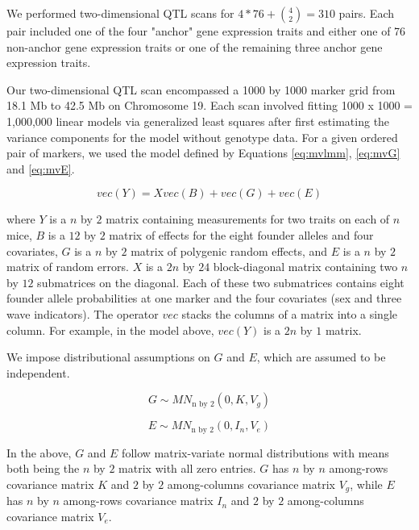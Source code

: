 \documentclass{article}
\begin{document}
We performed two-dimensional QTL scans for $4 * 76 + \binom{4}{2} = 310$ pairs. Each pair included one of the four "anchor" gene expression traits and either one of 76 non-anchor gene expression traits or one of the remaining three anchor gene expression traits. 

Our two-dimensional QTL scan encompassed a 1000 by 1000 marker grid from 18.1 Mb to 42.5 Mb on Chromosome 19. Each scan involved fitting 1000 x 1000 = 1,000,000 linear models via generalized least squares after first estimating the variance components for the model without genotype data. For a given ordered pair of markers, we used the model defined by Equations \ref{eq:mvlmm}, \ref{eq:mvG} and \ref{eq:mvE}.

\begin{equation}
vec(Y) = Xvec(B) + vec(G) + vec(E)
\label{eq:mvlmm}
\end{equation}

where $Y$ is a $n$ by $2$ matrix containing measurements for two traits on each of $n$ mice, $B$ is a $12$ by $2$ matrix of effects for the eight founder alleles and four covariates, $G$ is a $n$ by $2$ matrix of polygenic random effects, and $E$ is a $n$ by $2$ matrix of random errors. $X$ is a $2n$ by $24$ block-diagonal matrix containing two $n$ by $12$ submatrices on the diagonal. Each of these two submatrices contains eight founder allele probabilities at one marker and the four covariates (sex and three wave indicators). The operator $vec$ stacks the columns of a matrix into a single column. For example, in the model above, $vec(Y)$ is a $2n$ by $1$ matrix. 

We impose distributional assumptions on $G$ and $E$, which are assumed to be independent.

\begin{equation}
G \sim MN_{\text{n by 2}}(0, K, V_g)
\label{eq:mvG}
\end{equation}

\begin{equation}
E \sim MN_{\text{n by 2}}(0, I_n, V_e)
\label{eq:mvE}
\end{equation}

In the above, $G$ and $E$ follow matrix-variate normal distributions with means both being the $n$ by $2$ matrix with all zero entries. $G$ has $n$ by $n$ among-rows covariance matrix $K$ and $2$ by $2$ among-columns covariance matrix $V_g$, while $E$ has $n$ by $n$ among-rows covariance matrix $I_n$ and $2$ by $2$ among-columns covariance matrix $V_e$. 
\end{document}
